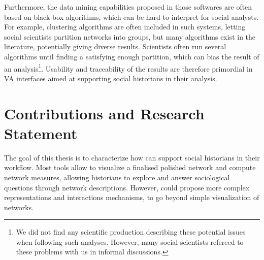 Furthermore, the data mining capabilities proposed in those softwares are often based on black-box algorithms, which can be hard to interpret for social analysts.
For example, clustering algorithms are often included in such systems, letting social scientists partition networks into groups, but many algorithms exist in the literature, potentially giving diverse results.
Scientists often run several algorithms until finding a satisfying enough partition, which can bias the result of an analysis\footnote{We did not find any scientific production describing these potential issues when following such analyses. However, many social scientists refereed to these problems with us in informal discussions.}.
Usability and traceability of the results are therefore primordial in VA interfaces aimed at supporting social historians in their analysis.




\section{Contributions and Research Statement}\label{sec:contribution-and-research-statement}

The goal of this thesis is to characterize how \va can support social historians in their \hsna workflow.
Most \snv tools allow to visualize a finalised polished network and compute network measures, allowing historians to explore and answer sociological questions through network descriptions.
However, \va could propose more complex representations and interactions mechanisms, to go beyond simple visualization of networks.

